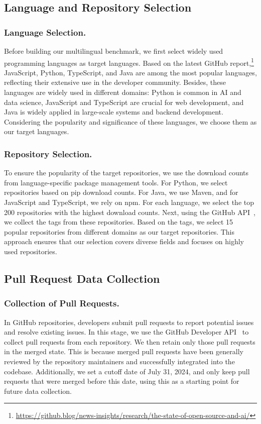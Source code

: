 \subsection{Language and Repository Selection}

\subsubsection{Language Selection.} Before building our multilingual benchmark, we first select widely used programming languages as target languages. Based on the latest GitHub report,\footnote{\url{https://github.blog/news-insights/research/the-state-of-open-source-and-ai/}} JavaScript, Python, TypeScript, and Java are among the most popular languages, reflecting their extensive use in the developer community. Besides, these languages are widely used in different domains: Python is common in AI and data science, JavaScript and TypeScript are crucial for web development, and Java is widely applied in large-scale systems and backend development. Considering the popularity and significance of these languages, we choose them as our target languages.

\subsubsection{Repository Selection.} 

To ensure the popularity of the target repositories, we use the download counts from language-specific package management tools. For Python, we select repositories based on pip download counts. For Java, we use Maven, and for JavaScript and TypeScript, we rely on npm. For each language, we select the top 200 repositories with the highest download counts. Next, using the GitHub API~\cite{github-rest-api}, we collect the tags from these repositories. Based on the tags, we select 15 popular repositories from different domains as our target repositories. This approach ensures that our selection covers diverse fields and focuses on highly used repositories.

\subsection{Pull Request Data Collection} 
\subsubsection{Collection of Pull Requests.} In GitHub repositories, developers submit pull requests to report potential issues and resolve existing issues. In this stage, we use the GitHub Developer API~\cite{github-rest-api} to collect pull requests from each repository. We then retain only those pull requests in the merged state. This is because merged pull requests have been generally reviewed by the repository maintainers and successfully integrated into the codebase. Additionally, we set a cutoff date of July 31, 2024, and only keep pull requests that were merged before this date, using this as a starting point for future data collection.

